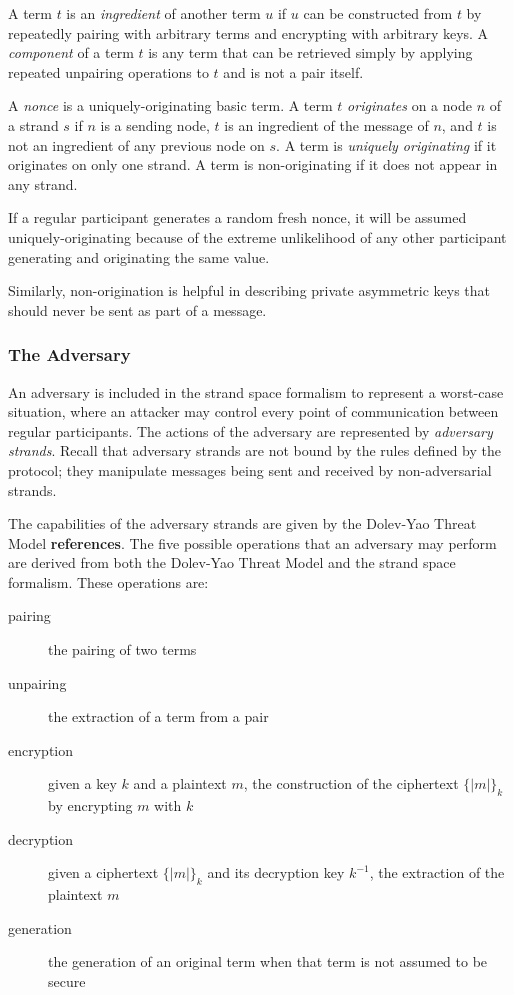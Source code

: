 			A term $t$ is an \emph{ingredient} of another term $u$ if $u$ can
			be constructed from $t$ by repeatedly pairing with arbitrary terms
			and encrypting with arbitrary keys. A \emph{component} of a term
			$t$ is any term that can be retrieved simply by applying repeated
			unpairing operations to $t$ and is not a pair itself.

			A \emph{nonce} is a uniquely-originating basic term. A term $t$
			\emph{originates} on a node $n$ of a strand $s$ if $n$ is a
			sending node, $t$ is an ingredient of the message of $n$, and
			$t$ is not an ingredient of any previous node on $s$. A term is
			\emph{uniquely originating} if it originates on only one
			strand. A term is non-originating if it does not appear in any
			strand.

			If a regular participant generates a random fresh nonce, it
			will be assumed uniquely-originating because of the extreme
			unlikelihood of any other participant generating and
			originating the same value.

			Similarly, non-origination is helpful in describing private
			asymmetric keys that should never be sent as part of a message.

		\subsubsection{The Adversary}
		\label{sec:application.the_adversary}

			An adversary is included in the strand space formalism to
			represent a worst-case situation, where an attacker may control
			every point of communication between regular participants. The
			actions of the adversary are represented by \emph{adversary
			strands}. Recall that adversary strands are not bound by the
			rules defined by the protocol; they manipulate messages being
			sent and received by non-adversarial strands.

			The capabilities of the adversary strands are given by the
			Dolev-Yao Threat Model \textbf{references}. The five possible
			operations that an adversary may perform are derived from both
			the Dolev-Yao Threat Model and the strand space formalism.
			These operations are:

			\begin{description}
			\item [pairing] the pairing of two terms
			\item [unpairing] the extraction of a term from a pair
			\item [encryption] given a key $k$ and a plaintext $m$, the construction of the ciphertext $\{|m|\}_k$ by encrypting $m$ with $k$
			\item [decryption] given a ciphertext $\{|m|\}_k$ and its decryption key $k^{-1}$, the extraction of the plaintext $m$
			\item [generation] the generation of an original term when that term is not assumed to be secure
			\end{description}

